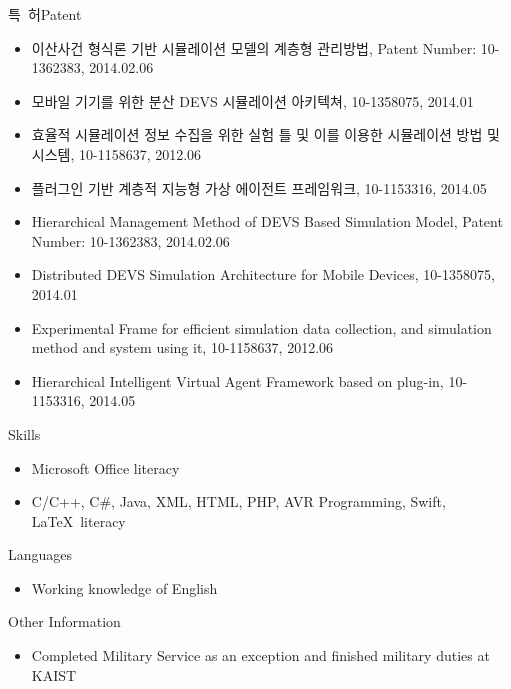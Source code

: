 \documentclass[english,full]{resume_structure}
\begin{document}
\begin{Others}
\ResumeSubSection %
    {특\ 허}{Patent}
    {}
    {
      \begin{itemize}
        \item 이산사건 형식론 기반 시뮬레이션 모델의 계층형 관리방법, Patent Number: 10-1362383, 2014.02.06
        \item 모바일 기기를 위한 분산 DEVS 시뮬레이션 아키텍쳐, 10-1358075, 2014.01
        \item 효율적 시뮬레이션 정보 수집을 위한 실험 틀 및 이를 이용한 시뮬레이션 방법 및 시스템, 10-1158637, 2012.06
        \item 플러그인 기반 계층적 지능형 가상 에이전트 프레임워크, 10-1153316, 2014.05
      \end{itemize}
    }
    {
      \begin{itemize}
        \item Hierarchical Management Method of DEVS Based Simulation Model, Patent Number: 10-1362383, 2014.02.06
        \item Distributed DEVS Simulation Architecture for Mobile Devices, 10-1358075, 2014.01
        \item Experimental Frame for efficient simulation data collection, and simulation method and system using it, 10-1158637, 2012.06
        \item Hierarchical Intelligent Virtual Agent Framework based on plug-in, 10-1153316, 2014.05
      \end{itemize}
    }
\end{Others}


\headedsubpublication %
{Skills}
{
\begin{itemize}
  \item Microsoft Office literacy
  \item C/C++, C\#, Java, XML, HTML, PHP, AVR Programming, Swift, \LaTeX \ literacy
\end{itemize}
}
\headedsubpublication %
{Languages}
{
\begin{itemize}
  \item Working knowledge of English
\end{itemize}
}
\headedsubpublication %
{Other Information}
{
\begin{itemize}
  \item Completed Military Service as an exception and finished military duties at KAIST 
\end{itemize}
}
\spacedhrule{1.6em}{-0.4em} %
\end{document}
